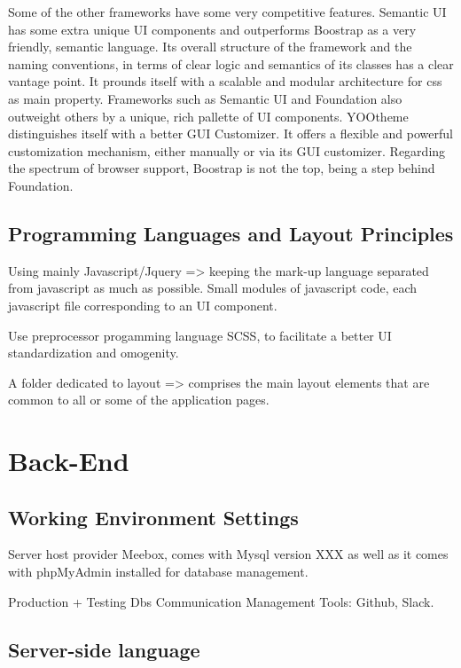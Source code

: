 Some of the other frameworks have some very competitive features. Semantic UI has some extra unique UI components and outperforms Boostrap as a very friendly, semantic language. Its overall structure of the framework and the naming conventions, in terms of clear logic and semantics of its classes has a clear vantage point. It prounds itself with a scalable and modular architecture for css as main property.
Frameworks such as Semantic UI and Foundation also outweight others by a unique, rich pallette of UI components.
YOOtheme distinguishes itself with a better GUI Customizer. It offers a flexible and powerful customization mechanism, either manually or via its GUI customizer.
Regarding the spectrum of browser support, Boostrap is not the top, being a step behind Foundation.\\

\subsection{Programming Languages and Layout Principles} 
Using mainly Javascript/Jquery => keeping the mark-up language separated from javascript as much as possible. Small modules of javascript code, each javascript file corresponding to an UI component.

Use preprocessor progamming language SCSS, to facilitate a better UI standardization and omogenity. 

A folder dedicated to layout => comprises the main layout elements that are common to all or some of the application pages. 



\section{Back-End}

\subsection{Working Environment Settings} 

Server host provider Meebox, comes with Mysql version XXX as well as it comes with phpMyAdmin installed for database management.

Production + Testing Dbs
Communication Management Tools: Github, Slack.


\subsection{Server-side language} 

